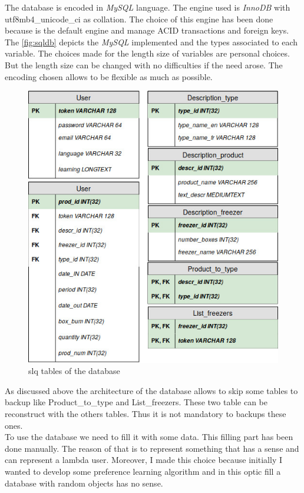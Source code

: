 The database is encoded in \textit{MySQL} language. The engine used is \textit{InnoDB} with utf8mb4\_unicode\_ci as collation. The choice of this engine has been done because is the default engine and manage ACID transactions and foreign keys. The \autoref{fig:sqldb} depicts the \textit{MySQL} implemented and the types associated to each variable. The choices made for the length size of variables are personal choices. But the length size can be changed with no difficulties if the need arose. The encoding chosen allows to be flexible as much as possible.

\begin{figure}[H]
\centering
\includegraphics[scale=0.5]{./images/sqldb.jpg}
\caption{slq tables of the database}
\label{fig:sqldb}
\end{figure}

As discussed above the architecture of the database allows to skip some tables to backup like Product\_to\_type and List\_freezers. These two table can be reconstruct with the others tables. Thus it is not mandatory to backups these ones.\\

To use the database we need to fill it with some data. This filling part has been done manually. The reason of that is to represent something that has a sense and can represent a lambda user. Moreover, I made this choice because initially I wanted to develop some preference learning algorithm and in this optic fill a database with random objects has no sense. 

